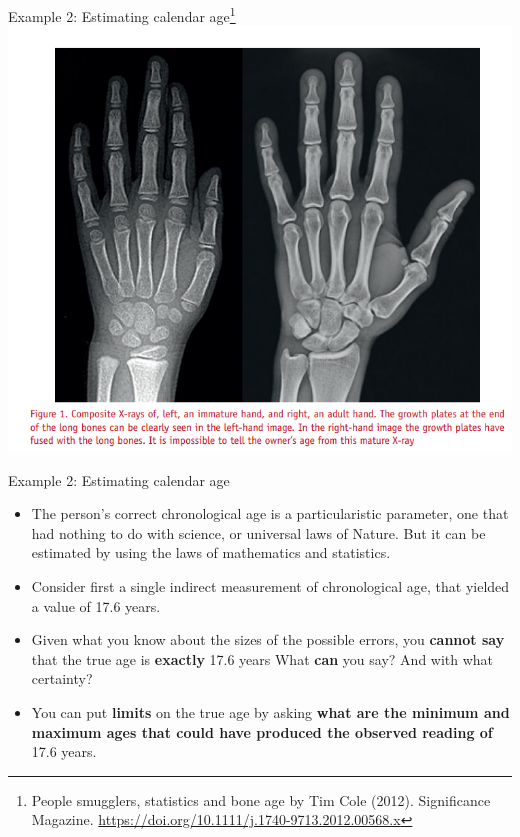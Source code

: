 \documentclass[10pt,handout]{beamer}\usepackage[]{graphicx}\usepackage[]{color}
\begin{document}
\begin{frame}{Example 2: Estimating calendar age\footnote{\tiny{People smugglers, statistics and bone age by Tim Cole (2012). Significance Magazine. \url{https://doi.org/10.1111/j.1740-9713.2012.00568.x}}}}
	\centering
	\includegraphics[scale=0.35]{xray.png}
\end{frame}


\begin{frame}{Example 2: Estimating calendar age}
\begin{itemize}
	\item The person's correct chronological age is a particularistic
	parameter, one that had nothing to do with science, or universal laws of
	Nature. But it can be estimated by using the laws of mathematics and
	statistics.
	\pause 
	
	\item Consider first a single indirect measurement of chronological age, that
	yielded a value of 17.6 years.
	
	\pause 
	
	\item Given what you know about the sizes of the possible errors, you
	\textbf{cannot say} that the true age is \textbf{exactly} 17.6 years
	What \textbf{can} you say? And with what certainty?
	
	\pause 
	
	\item You can put \textbf{limits} on the true age by asking \textbf{what are
		the minimum and maximum ages that could have produced the observed
		reading of} 17.6 years.
\end{itemize}
\end{frame}
\end{document}
